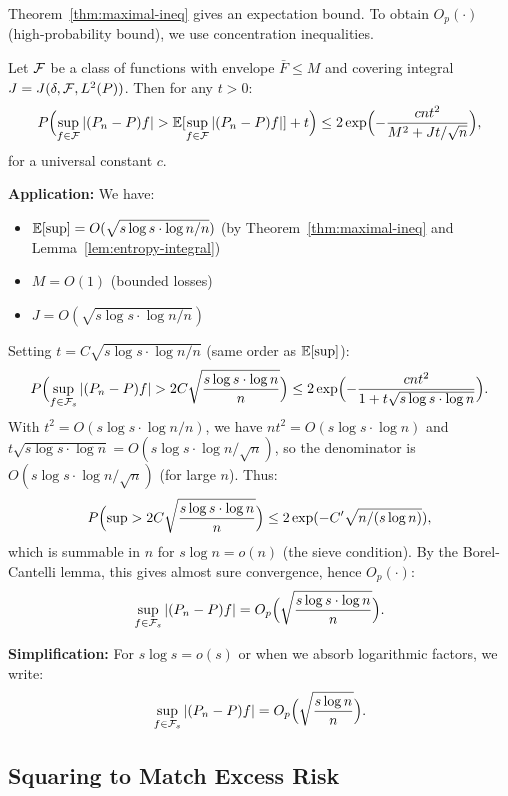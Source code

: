 \documentclass[12pt]{article}
\begin{document}
Theorem~\ref{thm:maximal-ineq} gives an expectation bound. To obtain $O_p(\cdot)$ (high-probability bound), we use concentration inequalities.

\begin{theorem}
\label{thm:talagrand}
Let $\mathcal{F}$ be a class of functions with envelope $\bar{F} \le M$ and covering integral $J = J(\delta, \mathcal{F}, L^2(P))$. Then for any $t > 0$:
\[
P\Bigl( \sup_{f \in \mathcal{F}} |(P_n - P)f| > \mathbb{E}[\sup_{f \in \mathcal{F}} |(P_n - P)f|] + t \Bigr) \le 2 \exp\Bigl( - \frac{cnt^2}{M^2 + Jt/\sqrt{n}} \Bigr),
\]
for a universal constant $c$.
\end{theorem}

\textbf{Application:}
We have:
\begin{itemize}
\item $\mathbb{E}[\sup] = O(\sqrt{s \log s \cdot \log n / n})$ (by Theorem~\ref{thm:maximal-ineq} and Lemma~\ref{lem:entropy-integral})
\item $M = O(1)$ (bounded losses)
\item $J = O(\sqrt{s \log s \cdot \log n / n})$
\end{itemize}

Setting $t = C \sqrt{s \log s \cdot \log n / n}$ (same order as $\mathbb{E}[\sup]$):
\[
P\Bigl( \sup_{f \in \mathcal{F}_s} |(P_n - P)f| > 2C \sqrt{\frac{s \log s \cdot \log n}{n}} \Bigr) \le 2 \exp\Bigl( - \frac{c n t^2}{1 + t \sqrt{s \log s \cdot \log n}} \Bigr).
\]
With $t^2 = O(s \log s \cdot \log n / n)$, we have $nt^2 = O(s \log s \cdot \log n)$ and $t\sqrt{s \log s \cdot \log n} = O(s \log s \cdot \log n / \sqrt{n})$, so the denominator is $O(s \log s \cdot \log n / \sqrt{n})$ (for large $n$). Thus:
\[
P\Bigl( \sup > 2C \sqrt{\frac{s \log s \cdot \log n}{n}} \Bigr) \le 2 \exp( - C' \sqrt{n / (s \log n)} ),
\]
which is summable in $n$ for $s \log n = o(n)$ (the sieve condition). By the Borel-Cantelli lemma, this gives almost sure convergence, hence $O_p(\cdot)$:
\[
\sup_{f \in \mathcal{F}_s} |(P_n - P)f| = O_p\Bigl( \sqrt{\frac{s \log s \cdot \log n}{n}} \Bigr).
\]

\textbf{Simplification:}
For $s \log s = o(s)$ or when we absorb logarithmic factors, we write:
\[
\sup_{f \in \mathcal{F}_s} |(P_n - P)f| = O_p\Bigl( \sqrt{\frac{s \log n}{n}} \Bigr).
\]

\subsection{Squaring to Match Excess Risk}
\end{document}
